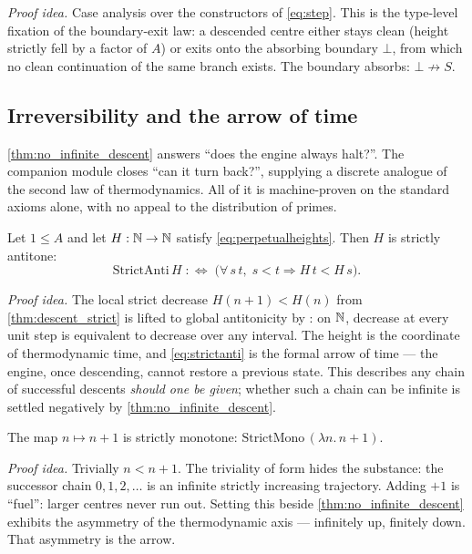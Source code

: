 \emph{Proof idea.} Case analysis over the constructors of \cref{eq:step}. This is the type-level
fixation of the boundary-exit law: a descended centre either stays clean (height strictly fell by a
factor of $A$) or exits onto the absorbing boundary $\bot$, from which no clean continuation of the
same branch exists. The boundary absorbs: $\bot\not\to S$.

\subsection{Irreversibility and the arrow of time}

\cref{thm:no_infinite_descent} answers ``does the engine always halt?''. The companion module
 closes ``can it turn back?'', supplying a discrete analogue of the
second law of thermodynamics. All of it is machine-proven on the standard axioms alone, with no
appeal to the distribution of primes.

\begin{theorem}\label{thm:engine_never_returns}
\green{}\; Let $1\le A$ and let $H:\mathbb{N}\to\mathbb{N}$ satisfy \cref{eq:perpetualheights}. Then $H$ is
strictly antitone:
\begin{equation}\label{eq:strictanti}
  \mathrm{StrictAnti}\,H \;:\Longleftrightarrow\; \bigl(\forall\, s\,t,\; s<t \Rightarrow H\,t<H\,s\bigr).
\end{equation}
\end{theorem}

\emph{Proof idea.} The local strict decrease $H(n+1)<H(n)$ from \cref{thm:descent_strict} is lifted
to global antitonicity by : on $\mathbb{N}$, decrease at every unit step is
equivalent to decrease over any interval. The height is the coordinate of thermodynamic time, and
\cref{eq:strictanti} is the formal arrow of time --- the engine, once descending, cannot restore a
previous state. This describes any chain of successful descents \emph{should one be given}; whether
such a chain can be infinite is settled negatively by \cref{thm:no_infinite_descent}.

\begin{theorem}\label{thm:fuel_ascent_strictMono}
\green{}\; The map $n\mapsto n+1$ is strictly monotone: $\mathrm{StrictMono}\,(\lambda n.\,n+1)$.
\end{theorem}

\emph{Proof idea.} Trivially $n<n+1$. The triviality of form hides the substance: the successor
chain $0,1,2,\dots$ is an infinite strictly increasing trajectory. Adding $+1$ is ``fuel'': larger
centres never run out. Setting this beside \cref{thm:no_infinite_descent} exhibits the asymmetry of
the thermodynamic axis --- infinitely up, finitely down. That asymmetry is the arrow.

